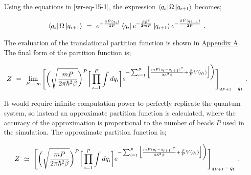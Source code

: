 \documentclass[11pt]{article}
\begin{document}
Using the equations in \ref{wr-eq-15-1}, the expression \begin{math} \bra{q_i} \Omega \ket{q_{i+1}} \end{math} becomes;

\begin{equation} \label{wr-eq-17-1}
\bra{q_i} \Omega \ket{q_{i+1}} \hspace{0.125cm} = \hspace{0.125cm}  e^{-\frac{\beta \hat{V}(q_i)}{2 P}} \bra{q_i} e^{- \frac{\beta \hat{p}^2}{2 m P}} \ket{q_{i+1}} e^{-\frac{\beta \hat{V}(q_{i+1})}{2 P}}  \hspace{0.125cm} .
\end{equation}

The evaluation of the translational partition function is shown in \hyperlink{wr-appendix-a}{Appendix A}. The final form of the partition function is; 

\begin{equation} \label{wr-eq-29-1}
Z \hspace{0.125cm} = \hspace{0.125cm} \lim_{P \rightarrow \infty} \Bigg[ \bigg(\sqrt{\frac{m P}{2 \pi \hbar^2 \beta}}\bigg)^{P} \bigg[ \prod_{i=1}^{P} \int d q_i \bigg] e^{- \sum_{i = 1}^{P} \Big[ \frac{ m P (q_i - q_{i+1})^2}{2 \hbar^2 \beta} + \frac{\beta}{P} V(q_i) \Big] \bigg)} \Bigg]_{q_{P + 1} \hspace{0.05cm} = \hspace{0.05cm} q_1} \hspace{0.125cm} .
\end{equation}

It would require infinite computation power to perfectly replicate the quantum system, so instead an approximate partition function is calculated, where the accuracy of the approximation is proportional to the number of beads \begin{math} P \end{math} used in the simulation. The approximate partition function is;

\begin{equation} \label{wr-eq-29-2}
Z \hspace{0.125cm} \simeq \hspace{0.125cm} \Bigg[ \bigg(\sqrt{\frac{m P}{2 \pi \hbar^2 \beta}}\bigg)^{P} \bigg[ \prod_{i=1}^{P} \int d q_i \bigg] e^{- \sum_{i = 1}^{P} \Big[ \frac{ m P (q_i - q_{i+1})^2}{2 \hbar^2 \beta} + \frac{\beta}{P} V(q_i) \Big] \bigg)} \Bigg]_{q_{P + 1} \hspace{0.05cm} = \hspace{0.05cm} q_1} \hspace{0.125cm} .
\end{equation}
\end{document}
